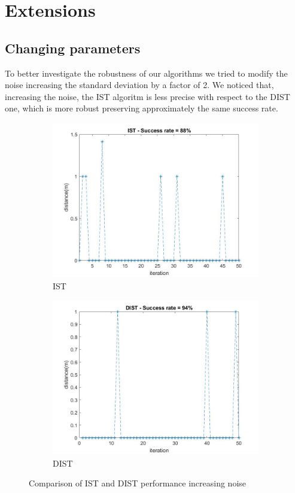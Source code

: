 \section{Extensions}

\subsection{Changing parameters}

To better investigate the robustness of our algorithms we tried to modify the noise increasing the standard deviation by a factor of 2. 
We noticed that, increasing the noise, the IST algoritm is less precise with respect to the DIST one, which is more robust preserving  
approximately the same success rate.

\begin{figure}[H]
    \begin{subfigure}{0.45\textwidth}
        \centering
        \includegraphics[width=\textwidth]{img/ist_2_devstd.jpg}
        \caption{IST}
    \end{subfigure}
    \hfill
    \begin{subfigure}{0.45\textwidth}
        \centering
        \includegraphics[width=\textwidth]{img/dist_2_devstd.jpg}
        \caption{DIST}
    \end{subfigure}
    \caption{Comparison of IST and DIST performance increasing noise}
\end{figure}


